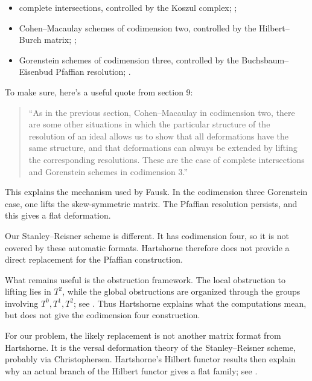 \begin{itemize}
\item complete intersections, controlled by
the Koszul complex;
\cite[\S 9]{Hartshorne-deformation};

\item Cohen--Macaulay schemes of
codimension two, controlled by the
Hilbert--Burch matrix;
\cite[\S 8]{Hartshorne-deformation};

\item Gorenstein schemes of codimension
three, controlled by the
Buchsbaum--Eisenbud Pfaffian resolution;
\cite[\S 9]{Hartshorne-deformation}.
\end{itemize}

To make sure, here's a useful quote
from section 9:

\begin{quotation} ``As in the previous
section, Cohen–Macaulay in codimension two,
there are some other situations in which the
particular structure of the resolution of an
ideal allows us to show that all deformations
have the same structure, and that
deformations can always be extended by
lifting the corresponding resolutions. These
are the case of complete intersections and
Gorenstein schemes in codimension 3.''
\end{quotation}


This explains the mechanism used by Fausk.
In the codimension three Gorenstein case,
one lifts the skew-symmetric matrix. The
Pfaffian resolution persists, and this gives
a flat deformation.

Our Stanley--Reisner scheme is different.
It has codimension four, so it is not covered
by these automatic formats. Hartshorne
therefore does not provide a direct
replacement for the Pfaffian construction.

What remains useful is the obstruction
framework. The local obstruction to lifting
lies in $T^2$, while the global obstructions
are organized through the groups involving
$T^0,T^1,T^2$; see
\cite[\S 10]{Hartshorne-deformation}.
Thus Hartshorne explains what the
computations mean, but does not give the
codimension four construction.

For our problem, the likely replacement is
not another matrix format from Hartshorne.
It is the versal deformation theory of the
Stanley--Reisner scheme, probably via
Christophersen. Hartshorne's Hilbert
functor results then explain why an actual
branch of the Hilbert functor gives a flat
family; see
\cite[\S 17]{Hartshorne-deformation}.




